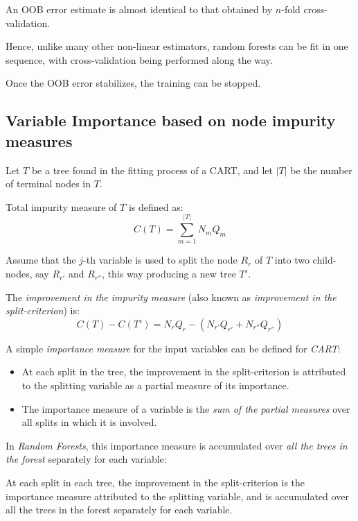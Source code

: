 An OOB error estimate is almost identical to that obtained by $n$-fold cross-validation.

Hence, unlike many other non-linear estimators, random forests can be fit in one sequence,
with cross-validation being performed along the way.

Once the OOB error stabilizes, the training can be stopped.

\subsection{Variable Importance based on node impurity measures}

Let $T$ be a tree found in the fitting process of a CART, and let
$|T|$ be the number of terminal nodes in $T$.

\begin{definition}{Total impurity measure}{} of $T$ is defined as:
	\begin{equation*}
		C(T) = \sum_{m=1}^{|T|} N_m Q_m
	\end{equation*}
\end{definition}

Assume that the $j$-th variable is used to split the node $R_r$ of $T$ into
two child-nodes, say $R_{r'}$ and $R_{r''}$, this way producing a new tree $T'$.

The \emph{improvement in the impurity measure} (also known as
\emph{improvement in the split-criterion}) is:
\begin{equation*}
	C(T) - C(T') = N_r Q_r - \left(N_{r'} Q_{r'} + N_{r''} Q_{r''} \right)
\end{equation*}

A simple \emph{importance measure} for the input variables can be defined for
\emph{CART}:
\begin{itemize}
	\item At each split in the tree, the improvement in the split-criterion
	      is attributed to the splitting variable as a partial measure of its
	      importance.
	\item The importance measure of a variable is the \emph{sum of
		      the partial measures} over all splits in which it is involved.
\end{itemize}

In \emph{Random Forests}, this importance measure is accumulated over \emph{all the trees in the forest}
separately for each variable:

At each split in each tree, the improvement in the split-criterion
is the importance measure attributed to the splitting variable, and
is accumulated over all the trees in the forest separately for each variable.

